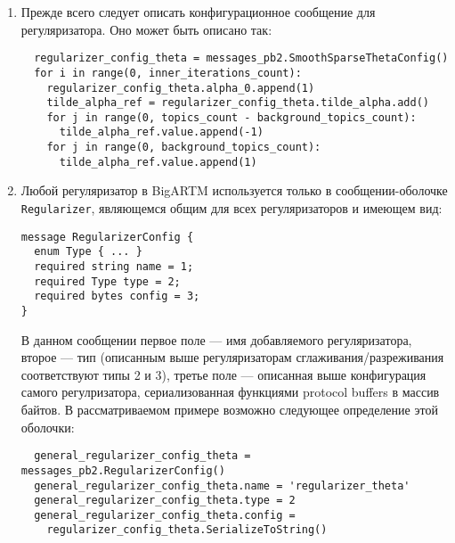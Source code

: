 \begin{enumerate}
	\item Прежде всего следует описать конфигурационное сообщение для регуляризатора. Оно может быть описано так:
	
	\vspace{4pt}
        \verb|  regularizer_config_theta = messages_pb2.SmoothSparseThetaConfig()| \\
        \verb|  for i in range(0, inner_iterations_count):| \\
        \verb|    regularizer_config_theta.alpha_0.append(1)| \\
        \verb|    tilde_alpha_ref = regularizer_config_theta.tilde_alpha.add()| \\
        \verb|    for j in range(0, topics_count - background_topics_count):| \\
        \verb|      tilde_alpha_ref.value.append(-1)| \\
        \verb|    for j in range(0, background_topics_count):| \\
        \verb|      tilde_alpha_ref.value.append(1)|
	\vspace{4pt}
	
	\item Любой регуляризатор в BigARTM используется только в сообщении-оболочке \verb|Regularizer|, являющемся общим для всех регуляризаторов и имеющем вид: 
	
	\vspace{4pt}
        \verb|message RegularizerConfig {| \\
        \verb|  enum Type { ... }| \\
        
        \verb|  required string name = 1;| \\
        \verb|  required Type type = 2;| \\
        \verb|  required bytes config = 3;| \\
        \verb|}|
	\vspace{4pt}
	
	В данном сообщении первое поле --- имя добавляемого регуляризатора, второе --- тип (описанным выше регуляризаторам сглаживания/разреживания соответствуют типы 2 и 3), третье поле --- описанная выше конфигурация самого регулризатора, сериализованная функциями protocol buffers в массив байтов. В рассматриваемом примере возможно следующее определение этой оболочки:
	
	\vspace{4pt}
        \verb|  general_regularizer_config_theta = messages_pb2.RegularizerConfig()| \\
        \verb|  general_regularizer_config_theta.name = 'regularizer_theta'| \\
        \verb|  general_regularizer_config_theta.type = 2| \\
        \verb|  general_regularizer_config_theta.config = | \\
        \verb|    regularizer_config_theta.SerializeToString()|
	\vspace{4pt}	
	

\end{enumerate}
